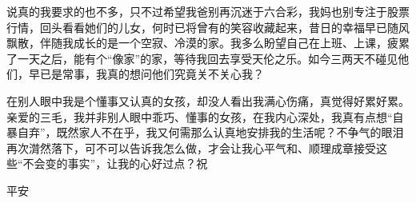 {    \par 说真的我要求的也不多，只不过希望我爸别再沉迷于六合彩，我妈也别专注于股票行情，回头看看她们的儿女，何时已将曾有的笑容收藏起来，昔日的幸福早已随风飘散，伴随我成长的是一个空寂、冷漠的家。我多么盼望自己在上班、上课，疲累了一天之后，能有个“像家”的家，等待我回去享受天伦之乐。如今三两天不碰见他们，早已是常事，我真的想问他们究竟关不关心我？
    \par 在别人眼中我是个懂事又认真的女孩，却没人看出我满心伤痛，真觉得好累好累。亲爱的三毛，我并非别人眼中乖巧、懂事的女孩，在我内心深处，我真有点想“自暴自弃”，既然家人不在乎，我又何需那么认真地安排我的生活呢？不争气的眼泪再次潸然落下，可不可以告诉我怎么做，才会让我心平气和、顺理成章接受这些“不会变的事实”，让我的心好过点？祝
    \par 平安
    \par {}
}


